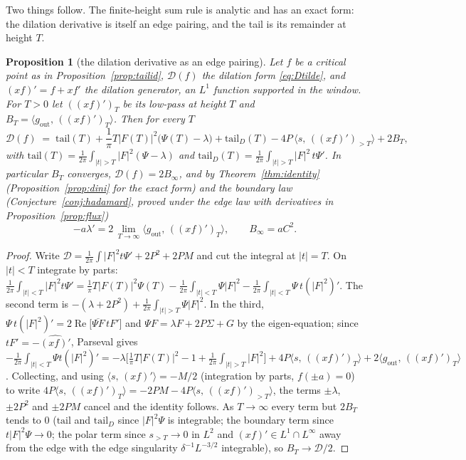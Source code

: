 \documentclass[11pt]{article}
\newtheorem{proposition}[theorem]{Proposition}
\theoremstyle{definition}
\theoremstyle{remark}
\newcommand{\ip}[2]{\langle #1,\, #2\rangle}
\DeclareMathOperator{\Ree}{Re}
\begin{document}
Two things follow. The finite-height sum rule is analytic and has an exact form: the dilation derivative is itself an edge pairing, and the tail is its remainder at height $T$.

\begin{proposition}[the dilation derivative as an edge pairing]\label{prop:pairing}
Let $f$ be a critical point as in Proposition~\ref{prop:tailid}, $\mathcal D(f)$ the dilation form \eqref{eq:Dtilde}, and $(xf)'=f+xf'$ the dilation generator, an $L^1$ function supported in the window. For $T>0$ let $((xf)')_T$ be its low-pass at height $T$ and $B_T=\ip{g_{\mathrm{out}}}{((xf)')_T}$. Then for every $T$
\[
\mathcal D(f)\;=\;\mathrm{tail}(T)+\frac1\pi T|F(T)|^2\big(\Psi(T)-\lambda\big)+\mathrm{tail}_D(T)-4P\,\ip{s}{((xf)')_{>T}}+2B_T,
\]
with $\mathrm{tail}(T)=\frac1{2\pi}\int_{|t|>T}|F|^2(\Psi-\lambda)$ and $\mathrm{tail}_D(T)=\frac1{2\pi}\int_{|t|>T}|F|^2\,t\Psi'$. In particular $B_T$ converges, $\mathcal D(f)=2B_\infty$, and by Theorem~\ref{thm:identity} (Proposition~\ref{prop:dini} for the exact form) and the boundary law (Conjecture~\ref{conj:hadamard}, proved under the edge law with derivatives in Proposition~\ref{prop:flux})
\[
-a\lambda'=2\,\lim_{T\to\infty}\ip{g_{\mathrm{out}}}{((xf)')_T},\qquad B_\infty=aC^2 .
\]
\end{proposition}
\begin{proof}
Write $\mathcal D=\frac1{2\pi}\int|F|^2t\Psi'+2P^2+2PM$ and cut the integral at $|t|=T$. On $|t|<T$ integrate by parts: $\frac1{2\pi}\int_{|t|<T}|F|^2t\Psi'=\frac1\pi T|F(T)|^2\Psi(T)-\frac1{2\pi}\int_{|t|<T}\Psi|F|^2-\frac1{2\pi}\int_{|t|<T}\Psi\,t(|F|^2)'$. The second term is $-(\lambda+2P^2)+\frac1{2\pi}\int_{|t|>T}\Psi|F|^2$. In the third, $\Psi\,t(|F|^2)'=2\Ree\big[\overline{\Psi F}\,tF'\big]$ and $\Psi F=\lambda F+2P\Sigma+G$ by the eigen-equation; since $tF'=-\widehat{(xf)'}$, Parseval gives $-\frac1{2\pi}\int_{|t|<T}\Psi t(|F|^2)'=-\lambda\big[\tfrac1\pi T|F(T)|^2-1+\tfrac1{2\pi}\int_{|t|>T}|F|^2\big]+4P\ip{s}{((xf)')_T}+2\ip{g_{\mathrm{out}}}{((xf)')_T}$. Collecting, and using $\ip s{(xf)'}=-M/2$ (integration by parts, $f(\pm a)=0$) to write $4P\ip s{((xf)')_T}=-2PM-4P\ip s{((xf)')_{>T}}$, the terms $\pm\lambda$, $\pm2P^2$ and $\pm2PM$ cancel and the identity follows. As $T\to\infty$ every term but $2B_T$ tends to $0$ ($\mathrm{tail}$ and $\mathrm{tail}_D$ since $|F|^2\Psi$ is integrable; the boundary term since $t|F|^2\Psi\to0$; the polar term since $s_{>T}\to0$ in $L^2$ and $(xf)'\in L^1\cap L^\infty$ away from the edge with the edge singularity $\delta^{-1}L^{-3/2}$ integrable), so $B_T\to\mathcal D/2$.
\end{proof}
\end{document}
